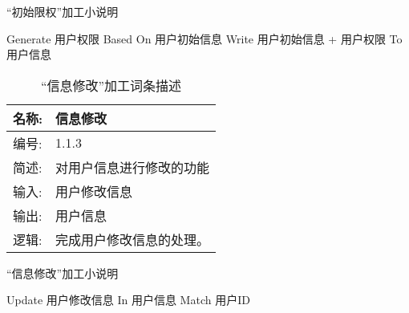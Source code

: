 \begin{algorithm}[H] 
    \renewcommand{\thealgorithm}{}
    \caption{“初始限权”加工小说明} 
    \label{alg3} 
    \begin{algorithmic}[1]
        \STATE Generate 用户权限 Based On 用户初始信息
        \STATE Write 用户初始信息 + 用户权限 To 用户信息 
    \end{algorithmic} 
\end{algorithm}

\begin{table}[H]  
\caption{“信息修改”加工词条描述}  
\begin{center}  
    \begin{tabular}{l p{11cm}} 
        \hline
        \quad 名称:  &   信息修改 \\
        \hline
        \quad 编号:  & 1.1.3 \\
        \hline
        \quad 简述:  & 对用户信息进行修改的功能 \\
        \hline
        \quad 输入:  & 用户修改信息 \\
        \hline
        \quad 输出:  & 用户信息 \\
        \hline
        \quad 逻辑:  & 完成用户修改信息的处理。 \\
        \hline
    \end{tabular}
    \label{tab1}
\end{center}
\end{table}

\begin{algorithm}[H] 
    \renewcommand{\thealgorithm}{}
    \caption{“信息修改”加工小说明} 
    \label{alg3} 
    \begin{algorithmic}[1]
        \STATE Update 用户修改信息 In 用户信息 Match 用户ID
    \end{algorithmic} 
\end{algorithm}